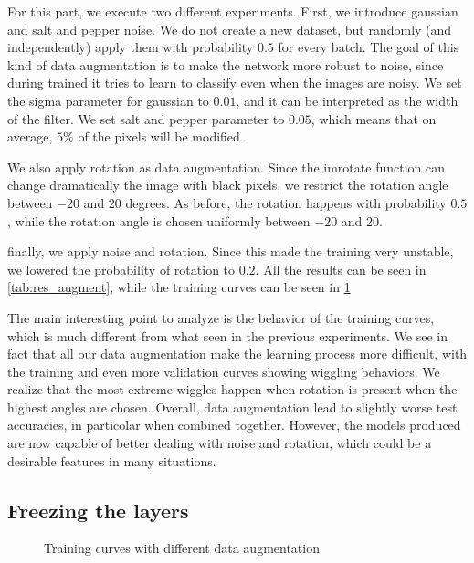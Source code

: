\documentclass{article}
\begin{document}
For this part, we execute two different experiments. First, we introduce gaussian and salt and pepper noise. We do not create a new dataset, but randomly (and independently) apply them with probability $0.5$ for every batch. The goal of this kind of data augmentation is to make the network more robust to noise, since during trained it tries to learn to classify even when the images are noisy. We set the sigma parameter for gaussian to $0.01$, and it can be interpreted as the width of the filter. We set salt and pepper parameter to $0.05$, which means that on average, $5\%$ of the pixels will be modified.

We also apply rotation as data augmentation. Since the imrotate function can change dramatically the image with black pixels, we restrict the rotation angle between $-20$ and $20$ degrees. As before, the rotation happens with probability $0.5$, while the rotation angle is chosen uniformly between $-20$ and $20$.

finally, we apply noise and rotation. Since this made the training very unstable, we lowered the probability of rotation to $0.2$. All the results can be seen in \cref{tab:res_augment}, while the training curves can be seen in \cref{fig:augment}

The main interesting point to analyze is the behavior of the training curves, which is much different from what seen in the previous experiments. We see in fact that all our data augmentation make the learning process more difficult, with the training and even more validation curves showing wiggling behaviors. We realize that the most extreme wiggles happen when rotation is present when the highest angles are chosen. Overall, data augmentation lead to slightly worse test accuracies, in particolar when combined together. However, the models produced are now capable of better dealing with noise and rotation, which could be a desirable features in many situations.

\subsection{Freezing the layers}

\begin{figure}[h]
    \centering
    \caption{Training curves with different data augmentation}

\label{fig:augment}
\end{figure}
\end{document}
